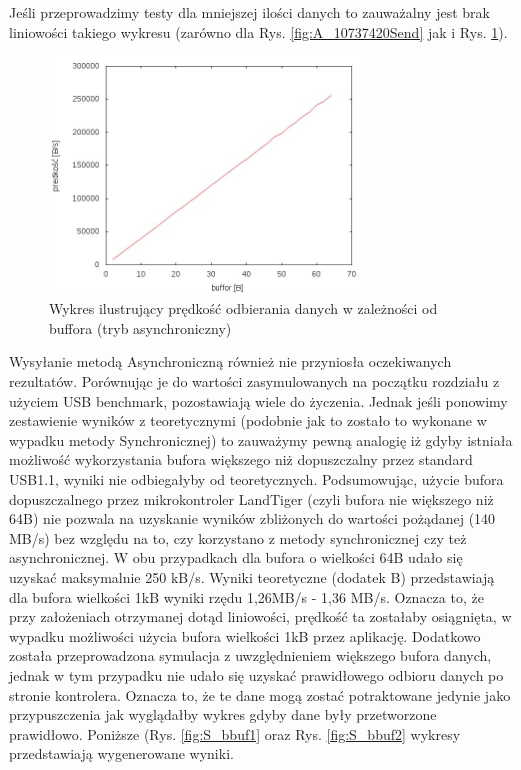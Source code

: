 \documentclass{BscUS}
\begin{document}
\noindent Jeśli przeprowadzimy testy dla mniejszej ilości danych to zauważalny jest brak liniowości takiego wykresu (zarówno dla Rys. \ref{fig:A_10737420Send} jak i Rys. \ref{fig:A_10737420Receive}).
\begin{figure}[H]
{
\centering
\includegraphics[width=0.75\textwidth]{./img/A_10737420Receive}
\caption{Wykres ilustrujący prędkość odbierania danych w zależności od buffora (tryb asynchroniczny)}
\label{fig:A_10737420Receive}
}
\end{figure}
\noindent Wysyłanie metodą Asynchroniczną również nie przyniosła oczekiwanych rezultatów. Porównując je do wartości zasymulowanych na początku rozdziału z użyciem USB benchmark, pozostawiają wiele do życzenia. Jednak jeśli ponowimy zestawienie wyników z teoretycznymi (podobnie jak to zostało to wykonane w wypadku metody Synchronicznej) to zauważymy pewną analogię iż gdyby istniała możliwość wykorzystania bufora większego niż dopuszczalny przez standard USB1.1, wyniki nie odbiegałyby od teoretycznych.
\indent Podsumowując, użycie bufora dopuszczalnego przez mikrokontroler LandTiger (czyli bufora nie większego niż 64B) nie pozwala na uzyskanie wyników zbliżonych do wartości pożądanej (140 MB/s) bez względu na to, czy korzystano z metody synchronicznej czy też asynchronicznej. W obu przypadkach dla bufora o wielkości 64B udało się uzyskać maksymalnie 250 kB/s. Wyniki teoretyczne (dodatek B) przedstawiają dla bufora wielkości 1kB wyniki rzędu 1,26MB/s - 1,36 MB/s. Oznacza to, że przy założeniach otrzymanej dotąd liniowości, prędkość ta zostałaby osiągnięta, w wypadku możliwości użycia bufora wielkości 1kB przez aplikację.
\newline
\noindent Dodatkowo została przeprowadzona symulacja z uwzględnieniem większego bufora danych, jednak w tym przypadku nie udało się uzyskać prawidłowego odbioru danych  po stronie kontrolera. Oznacza to, że te dane mogą zostać potraktowane jedynie jako przypuszczenia jak wyglądałby wykres gdyby dane były przetworzone prawidłowo. Poniższe (Rys. \ref{fig:S_bbuf1} oraz Rys. \ref{fig:S_bbuf2} wykresy przedstawiają wygenerowane wyniki.
\end{document}
